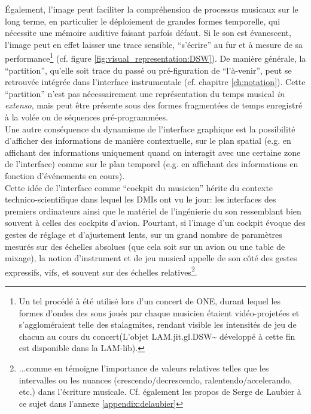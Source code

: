 \indent Également, l'image peut faciliter la compréhension de processus musicaux sur le long terme, en particulier le déploiement de grandes formes temporelle, qui nécessite une mémoire auditive faisant parfois défaut. Si le son est évanescent, l'image peut en effet laisser une trace sensible, ``s'écrire'' au fur et à mesure de sa performance\footnote{Un tel procédé à été utilisé lors d'un concert de ONE, durant lequel les formes d'ondes des sons joués par chaque musicien étaient vidéo-projetées et s'aggloméraient telle des stalagmites, rendant visible les intensités de jeu de chacun au cours du concert(L'objet LAM.jit.gl.DSW\textasciitilde{} développé à cette fin est disponible dans la LAM-lib).} (cf. figure \ref{fig:visual_representation:DSW}). De manière générale, la ``partition'', qu'elle soit trace du passé ou pré-figuration de ``l'à-venir'', peut se retrouvée intégrée dans l'interface instrumentale (cf. chapitre \ref{ch:notation}). Cette ``partition'' n'est pas nécessairement une représentation du temps musical \textit{in extenso}, mais peut être présente sous des formes fragmentées de temps enregistré à la volée ou de séquences pré-programmées.\\
\indent Une autre conséquence du dynamisme de l'interface graphique est la possibilité d'afficher des informations de manière contextuelle, sur le plan spatial (e.g. en affichant des informations uniquement quand on interagit avec une certaine zone de l'interface) comme sur le plan temporel (e.g. en affichant des informations en fonction d'événements en cours).\\
\indent Cette idée de l'interface comme ``cockpit du musicien'' \cite{vertegaal_towards_1996} hérite du contexte technico-scientifique dans lequel les \glspl{DMI} ont vu le jour: les interfaces des premiers ordinateurs ainsi que le matériel de l'ingénierie du son ressemblant bien souvent à celles des cockpits d'avion. Pourtant, si l'image d'un cockpit évoque des gestes de réglage et d'ajustement lents, sur un grand nombre de paramètres mesurés sur des échelles absolues (que cela soit sur un avion ou une table de mixage), la notion d'instrument et de jeu musical appelle de son côté des gestes expressifs, vifs, et souvent sur des échelles relatives\footnote{...comme en témoigne l'importance de valeurs relatives telles que les intervalles ou les nuances (crescendo/decrescendo, ralentendo/accelerando, etc.) dans l'écriture musicale. Cf. également les propos de Serge de Laubier à ce sujet dans l'annexe \ref{appendix:delaubier}}.

